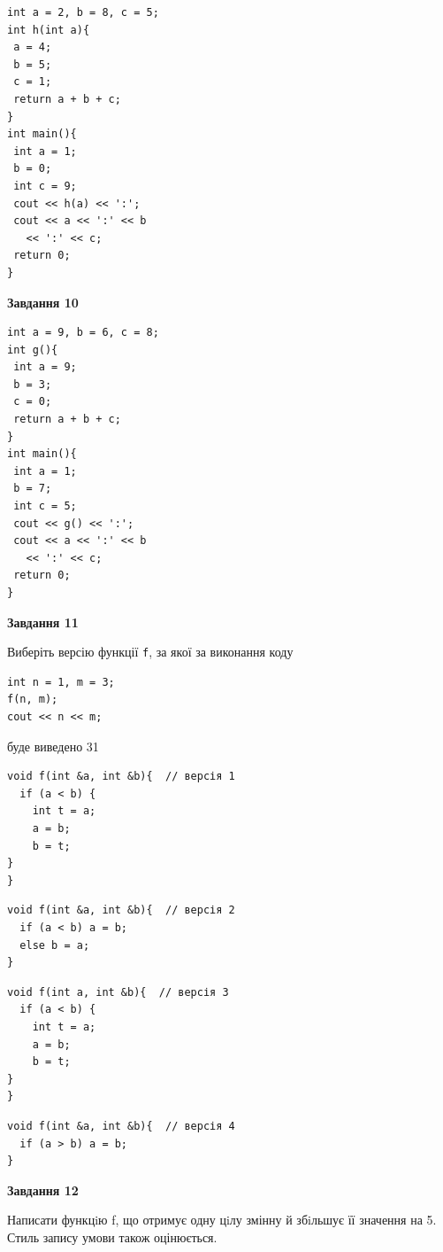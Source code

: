 \documentclass[12pt, ukrainian]{article}
\def\code#1{\Verb!#1!}
\begin{document}
{\begin {large}
\begin{minipage}[t]{7.0cm}
\begin{verbatim}
int a = 2, b = 8, c = 5;
int h(int a){
 a = 4;
 b = 5;
 c = 1;
 return a + b + c;
}
int main(){
 int a = 1;
 b = 0;
 int c = 9;
 cout << h(a) << ':';
 cout << a << ':' << b 
   << ':' << c;
 return 0;
}
\end{verbatim}



\begin{center}
\textbf{Завдання 10}
\end{center}
\vspace{-8mm}

\begin{verbatim}
int a = 9, b = 6, c = 8;
int g(){
 int a = 9;
 b = 3;
 c = 0;
 return a + b + c;
}
int main(){
 int a = 1;
 b = 7;
 int c = 5;
 cout << g() << ':';
 cout << a << ':' << b 
   << ':' << c;
 return 0;
}
\end{verbatim}

\end{minipage}
\vline \hspace{1mm}
\begin{minipage}[t]{11.0cm}

\begin{center}
\textbf{Завдання 11}
\end{center}
Виберіть версію функції \code{f}, за якої за виконання коду
\begin{verbatim}
int n = 1, m = 3;
f(n, m);
cout << n << m;
\end{verbatim}

буде виведено 31

\begin{verbatim}
void f(int &a, int &b){  // версія 1
  if (a < b) {
    int t = a;
    a = b;
    b = t;
}  
}
\end{verbatim}

\vspace{-8mm}\begin{verbatim}
void f(int &a, int &b){  // версія 2
  if (a < b) a = b;
  else b = a;
}
\end{verbatim}

\vspace{-8mm}\begin{verbatim}
void f(int a, int &b){  // версія 3
  if (a < b) {
    int t = a;
    a = b;
    b = t;
}  
}
\end{verbatim}

\vspace{-8mm}\begin{verbatim}
void f(int &a, int &b){  // версія 4
  if (a > b) a = b;
}
\end{verbatim}



\begin{center}
\textbf{Завдання 12}
\end{center}

Написати функцiю f, що отримує одну цiлу змінну й збiльшує її значення на 5. Стиль запису умови також оцінюється.\par

\end{minipage}

\end {large}}
\newpage
\end{document}
